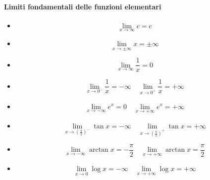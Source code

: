 \documentclass{article}
\theoremstyle{plain}
\theoremstyle{definition}
\theoremstyle{remark}
\begin{document}
\paragraph{Limiti fondamentali delle funzioni elementari}
\begin{multicols}{2}
\begin{itemize}
    \item[] \[\lim\limits_{x\to\infty}c=c\]
    \item[] \[\lim\limits_{x\to\pm\infty}x=\pm\infty\]
    \item[] \[\lim\limits_{x\to\infty}\frac{1}{x}=0\]
    \item[] \[\lim\limits_{x\to 0^-}\frac{1}{x}=-\infty\quad \lim\limits_{x\to0^+}\frac{1}{x}=+\infty\]
    \columnbreak
    \item[] \[\lim\limits_{x\to -\infty}e^x=0\quad \lim\limits_{x\to +\infty}e^x=+\infty\]
    \item[] \[\lim\limits_{x\to (\frac{\pi}{2})^-}\tan x=-\infty\quad \lim\limits_{x\to (\frac{\pi}{2})^+}\tan x=+\infty\]
    \item[] \[\lim\limits_{x\to -\infty}\arctan x=-\frac{\pi}{2}\quad \lim\limits_{x\to+\infty}\arctan x=\frac{\pi}{2}\]
    \item[] \[\lim\limits_{x\to 0}\log x=-\infty\quad \lim\limits_{x\to+\infty}\log x=+\infty\]
\end{itemize}
\end{multicols}

\vspace{10pt}
\end{document}
